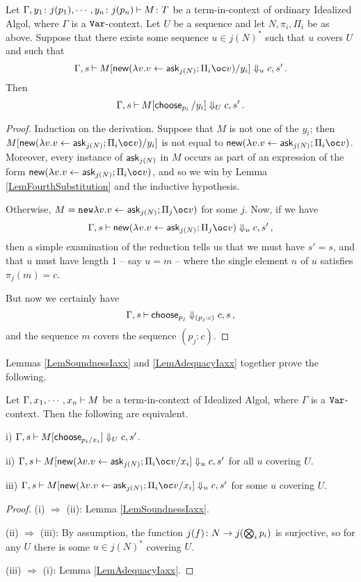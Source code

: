 \begin{lemma}
  Let $\Gamma,y_1\colon j(p_1),\cdots,y_n\colon j(p_n) \mathbin{\vdash} M \colon T$ be a term-in-context of ordinary Idealized Algol, where $\Gamma$ is a ${\mathtt{Var}}$-context.  
  Let $U$ be a sequence and let $N,\pi_i,\Pi_i$ be as above.
  Suppose that there exists some sequence $u\in j(N)^*$ such that $u$ covers $U$ and such that
  \[
    \Gamma,s\ts M[\neww(\lambda v.v\gets \ask_{j(N)};\Pi_i \oc v)/y_i]\converges_u c,s'\,.
    \]
  Then
  \[
    \Gamma,s\mathbin{\vdash} M[\operatorname{\mathsf{choose}}_{p_i}/y_i] \Downarrow_U c,s'\,.
    \]
  \label{LemAdequacyIaxx}
\end{lemma}
\begin{proof}
  Induction on the derivation.
  Suppose that $M$ is not one of the $y_i$; then $M[\neww(\lambda v.v\gets\ask_{j(N)};\Pi_i \oc v)/y_i]$ is not equal to $\neww(\lambda v.v\gets\ask_{j(N)};\Pi_i \oc v)$.
  Moreover, every instance of $\operatorname{{\mathsf{ask}}}_{j(N)}$ in $M$ occurs as part of an expression of the form $\neww(\lambda v.v\gets\ask_{j(N)};\Pi_i \oc v)$, and so we win by Lemma \ref{LemFourthSubstitution} and the inductive hypothesis.

  Otherwise, $M=\new\lambda v.v\gets \ask_{j(N)};\Pi_j\oc v)$ for some $j$.  
  Now, if we have
  \[
    \Gamma,s\ts \neww(\lambda v.v\gets\ask_{j(N)};\Pi_j\oc v)\converges_u c,s'\,,
    \]
  then a simple examination of the reduction tells us that we must have $s'=s$, and that $u$ must have length $1$ -- say $u=m$ -- where the single element $n$ of $u$ satisfies $\pi_j(m)=c$.

  But now we certainly have
  \[
    \Gamma,s\mathbin{\vdash} \operatorname{\mathsf{choose}}_{p_j} \Downarrow_{(p_j:c)} c,s\,,
    \]
  and the sequence $m$ covers the sequence $(p_j:c)$.
\end{proof}

Lemmas \ref{LemSoundnessIaxx} and \ref{LemAdequacyIaxx} together prove the following.

\begin{lemma}
  Let $\Gamma,x_1,\cdots,x_n\mathbin{\vdash} M$ be a term-in-context of Idealized Algol, where $\Gamma$ is a ${\mathtt{Var}}$-context.
  Then the following are equivalent.

  i) $\Gamma,s\mathbin{\vdash} M[\operatorname{\mathsf{choose}}_{p_i/x_i}]\Downarrow_U c,s'$.
  
  ii) $\Gamma,s\ts M[\neww(\lambda v.v\gets\ask_{j(N)};\Pi_i \oc v/x_i]\converges_u c,s'$ for all $u$ covering $U$.

  iii) $\Gamma,s\ts M[\neww(\lambda v.v\gets\ask_{j(N)};\Pi_i \oc v/x_i]\converges_u c,s'$ for some $u$ covering $U$.
  \label{LemComputationalAdequacyIaxx}
\end{lemma}
\begin{proof}
  (i) $\Rightarrow$ (ii): Lemma \ref{LemSoundnessIaxx}.

  (ii) $\Rightarrow$ (iii): By assumption, the function $j(f) \colon N \to j(\bigotimes_i p_i)$ is surjective, so for any $U$ there is some $u\in j(N)^*$ covering $U$.

  (iii) $\Rightarrow$ (i): Lemma \ref{LemAdequacyIaxx}.
\end{proof}

